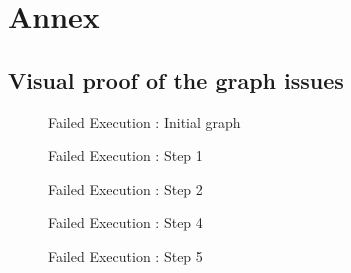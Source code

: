 \section*{Annex}

\subsection{Visual proof of the graph issues}
\begin{figure}[H]
  \caption{Failed Execution : Initial graph}
  \begin{center}
    \begin{tikzpicture}[scale=0.9,transform shape]
      
    \end{tikzpicture}
  \end{center}
\end{figure}

\begin{figure}[H]
  \caption{Failed Execution : Step 1}
  \begin{center}
    \begin{tikzpicture}[scale=0.9,transform shape]
      
    \end{tikzpicture}
  \end{center}
\end{figure}

\begin{figure}[H]
  \caption{Failed Execution : Step 2}
  \begin{center}
    \begin{tikzpicture}[scale=0.9,transform shape]
      
    \end{tikzpicture}
  \end{center}
\end{figure}

\begin{figure}[H]
  \caption{Failed Execution : Step 4}
  \begin{center}
    \begin{tikzpicture}[scale=0.9,transform shape]
      
    \end{tikzpicture}
  \end{center}
\end{figure}

\begin{figure}[H]
  \caption{Failed Execution : Step 5}
  \begin{center}
    \begin{tikzpicture}[scale=0.9,transform shape]
      
    \end{tikzpicture}
  \end{center}
\end{figure}

